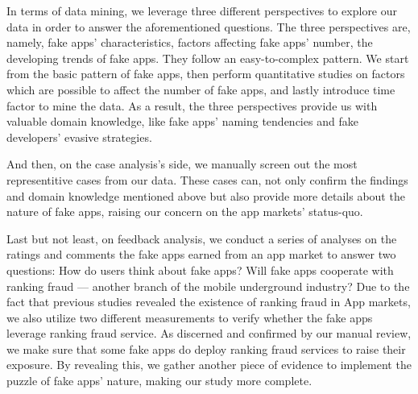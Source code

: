 In terms of data mining, we leverage three different perspectives to explore our data in order to answer the aforementioned questions.
The three perspectives are, namely, fake apps' characteristics, factors affecting fake apps' number, the developing trends of fake apps.
They follow an easy-to-complex pattern.
We start from the basic pattern of fake apps, then perform quantitative studies on factors which are possible to affect the number of fake apps, and lastly introduce time factor to mine the data.
As a result, the three perspectives provide us with valuable domain knowledge, like fake apps’ naming tendencies and fake developers’ evasive strategies.

And then, on the case analysis's side, we manually screen out the most representitive cases from our data.
These cases can, not only confirm the findings and domain knowledge mentioned above but also provide more details about the nature of fake apps, raising our concern on the app markets' status-quo.

Last but not least, on feedback analysis, we conduct a series of analyses on the ratings and comments the fake apps earned from an app market to answer two questions: How do users think about fake apps? Will fake apps cooperate with ranking fraud --- another branch of the mobile underground industry?
Due to the fact that previous studies revealed the existence of ranking fraud in App markets, we also utilize two different measurements to verify whether the fake apps leverage ranking fraud service.
As discerned and confirmed by our manual review, we make sure that some fake apps do deploy ranking fraud services to raise their exposure.
By revealing this, we gather another piece of evidence to implement the puzzle of fake apps' nature, making our study more complete.

